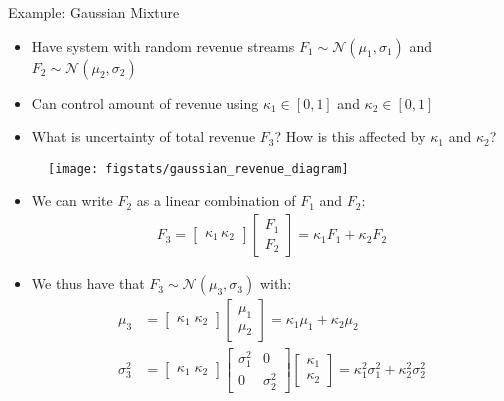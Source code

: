\documentclass[9pt]{beamer}
\begin{document}
%
\begin{frame}{Example: Gaussian Mixture}
\begin{block}{}
\begin{itemize}
\item Have system with random revenue streams $F_1\sim\mathcal{N}(\mu_1,\sigma_1)$ and $F_2\sim\mathcal{N}(\mu_2,\sigma_2)$
\item Can control amount of revenue using $\kappa_1\in [0,1]$ and $\kappa_2\in [0,1]$
\item What is uncertainty of total revenue $F_3$? How is this affected by $\kappa_1$ and $\kappa_2$? 
\end{itemize}
\end{block}

\begin{figure}[!htb]
    \centering
	\texttt{[image: figstats/gaussian\_revenue\_diagram]}
\end{figure}
\pause 
\begin{itemize}
\item We can write $F_2$ as a linear combination of $F_1$ and $F_2$:
\begin{align*}
F_3=\left[\begin{array}{c} \kappa_1\, \kappa_2
\end{array}\right]\left[\begin{array}{c} F_1\\ F_2
\end{array}\right]=\kappa_1F_1+\kappa_2F_2
\end{align*}
\item We thus have that $F_3\sim\mathcal{N}(\mu_3,\sigma_3)$ with:
\begin{align*}
\mu_3&=\left[\begin{array}{c} \kappa_1\; \kappa_2
\end{array}\right]\left[\begin{array}{c} \mu_1\\ \mu_2
\end{array}\right]=\kappa_1\mu_1+\kappa_2\mu_2\\
\sigma_3^2&=\left[\begin{array}{c} \kappa_1\; \kappa_2
\end{array}\right]\left[\begin{array}{cc} \sigma_1^2&0\\0&\sigma_2^2
\end{array}\right]
\left[\begin{array}{c} \kappa_1\\ \kappa_2
\end{array}\right]=\kappa_1^2\sigma_1^2+\kappa_2^2\sigma_2^2
\end{align*}
\end{itemize}


\end{frame}
\end{document}
